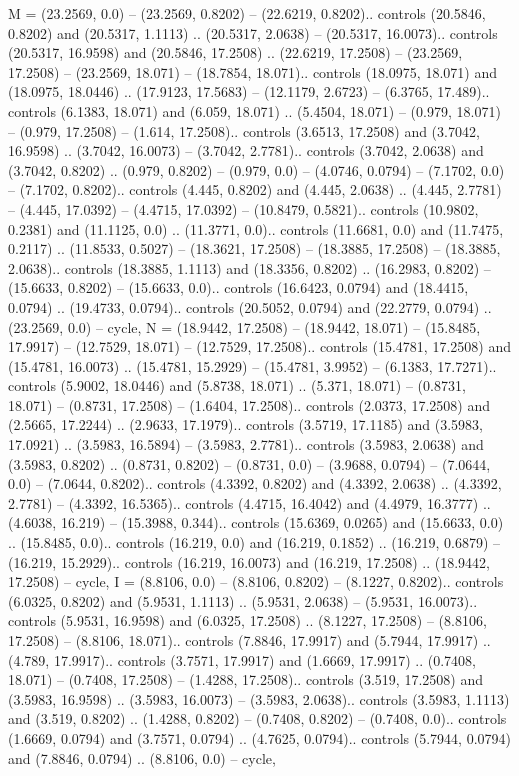 {M} = {(23.2569, 0.0) -- (23.2569, 0.8202) -- (22.6219, 0.8202).. controls (20.5846, 0.8202) and (20.5317, 1.1113) .. (20.5317, 2.0638) -- (20.5317, 16.0073).. controls (20.5317, 16.9598) and (20.5846, 17.2508) .. (22.6219, 17.2508) -- (23.2569, 17.2508) -- (23.2569, 18.071) -- (18.7854, 18.071).. controls (18.0975, 18.071) and (18.0975, 18.0446) .. (17.9123, 17.5683) -- (12.1179, 2.6723) -- (6.3765, 17.489).. controls (6.1383, 18.071) and (6.059, 18.071) .. (5.4504, 18.071) -- (0.979, 18.071) -- (0.979, 17.2508) -- (1.614, 17.2508).. controls (3.6513, 17.2508) and (3.7042, 16.9598) .. (3.7042, 16.0073) -- (3.7042, 2.7781).. controls (3.7042, 2.0638) and (3.7042, 0.8202) .. (0.979, 0.8202) -- (0.979, 0.0) -- (4.0746, 0.0794) -- (7.1702, 0.0) -- (7.1702, 0.8202).. controls (4.445, 0.8202) and (4.445, 2.0638) .. (4.445, 2.7781) -- (4.445, 17.0392) -- (4.4715, 17.0392) -- (10.8479, 0.5821).. controls (10.9802, 0.2381) and (11.1125, 0.0) .. (11.3771, 0.0).. controls (11.6681, 0.0) and (11.7475, 0.2117) .. (11.8533, 0.5027) -- (18.3621, 17.2508) -- (18.3885, 17.2508) -- (18.3885, 2.0638).. controls (18.3885, 1.1113) and (18.3356, 0.8202) .. (16.2983, 0.8202) -- (15.6633, 0.8202) -- (15.6633, 0.0).. controls (16.6423, 0.0794) and (18.4415, 0.0794) .. (19.4733, 0.0794).. controls (20.5052, 0.0794) and (22.2779, 0.0794) .. (23.2569, 0.0) -- cycle},
{N} = {(18.9442, 17.2508) -- (18.9442, 18.071) -- (15.8485, 17.9917) -- (12.7529, 18.071) -- (12.7529, 17.2508).. controls (15.4781, 17.2508) and (15.4781, 16.0073) .. (15.4781, 15.2929) -- (15.4781, 3.9952) -- (6.1383, 17.7271).. controls (5.9002, 18.0446) and (5.8738, 18.071) .. (5.371, 18.071) -- (0.8731, 18.071) -- (0.8731, 17.2508) -- (1.6404, 17.2508).. controls (2.0373, 17.2508) and (2.5665, 17.2244) .. (2.9633, 17.1979).. controls (3.5719, 17.1185) and (3.5983, 17.0921) .. (3.5983, 16.5894) -- (3.5983, 2.7781).. controls (3.5983, 2.0638) and (3.5983, 0.8202) .. (0.8731, 0.8202) -- (0.8731, 0.0) -- (3.9688, 0.0794) -- (7.0644, 0.0) -- (7.0644, 0.8202).. controls (4.3392, 0.8202) and (4.3392, 2.0638) .. (4.3392, 2.7781) -- (4.3392, 16.5365).. controls (4.4715, 16.4042) and (4.4979, 16.3777) .. (4.6038, 16.219) -- (15.3988, 0.344).. controls (15.6369, 0.0265) and (15.6633, 0.0) .. (15.8485, 0.0).. controls (16.219, 0.0) and (16.219, 0.1852) .. (16.219, 0.6879) -- (16.219, 15.2929).. controls (16.219, 16.0073) and (16.219, 17.2508) .. (18.9442, 17.2508) -- cycle},
{I} = {(8.8106, 0.0) -- (8.8106, 0.8202) -- (8.1227, 0.8202).. controls (6.0325, 0.8202) and (5.9531, 1.1113) .. (5.9531, 2.0638) -- (5.9531, 16.0073).. controls (5.9531, 16.9598) and (6.0325, 17.2508) .. (8.1227, 17.2508) -- (8.8106, 17.2508) -- (8.8106, 18.071).. controls (7.8846, 17.9917) and (5.7944, 17.9917) .. (4.789, 17.9917).. controls (3.7571, 17.9917) and (1.6669, 17.9917) .. (0.7408, 18.071) -- (0.7408, 17.2508) -- (1.4288, 17.2508).. controls (3.519, 17.2508) and (3.5983, 16.9598) .. (3.5983, 16.0073) -- (3.5983, 2.0638).. controls (3.5983, 1.1113) and (3.519, 0.8202) .. (1.4288, 0.8202) -- (0.7408, 0.8202) -- (0.7408, 0.0).. controls (1.6669, 0.0794) and (3.7571, 0.0794) .. (4.7625, 0.0794).. controls (5.7944, 0.0794) and (7.8846, 0.0794) .. (8.8106, 0.0) -- cycle},

